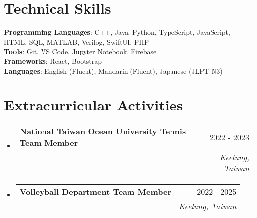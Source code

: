 \documentclass[letterpaper,11pt]{article}
\makeatletter
\newcommand{\resumeSubheading}[4]{
  \vspace{-2pt}\item
    \begin{tabular*}{0.97\textwidth}[t]{l@{\extracolsep{\fill}}r}
      \textbf{#1} & #2 \\
      \textit{\small#3} & \textit{\small #4} \\
    \end{tabular*}\vspace{-7pt}
}
\newcommand{\resumeSubHeadingListStart}{\begin{itemize}[leftmargin=0.15in, label={}]}
\newcommand{\resumeSubHeadingListEnd}{\end{itemize}}
\makeatother
\begin{document}
\section{Technical Skills}
 \begin{itemize}[leftmargin=0.15in, label={}]
    \small{\item{
     \textbf{Programming Languages}{: C++, Java, Python, TypeScript, JavaScript, HTML, SQL, MATLAB, Verilog, SwiftUI, PHP} \\
     \textbf{Tools}{: Git, VS Code, Jupyter Notebook, Firebase} \\
     \textbf{Frameworks}{: React, Bootstrap} \\
     \textbf{Languages}{: English (Fluent), Mandarin (Fluent), Japanese (JLPT N3)}
    }}
 \end{itemize}

\section{Extracurricular Activities}
    \resumeSubHeadingListStart
      \resumeSubheading
        {National Taiwan Ocean University Tennis Team Member}{2022 - 2023}{}{Keelung, Taiwan}
      \resumeSubheading
        {Volleyball Department Team Member}{2022 - 2025}{}{Keelung, Taiwan}
    \resumeSubHeadingListEnd
\end{document}
